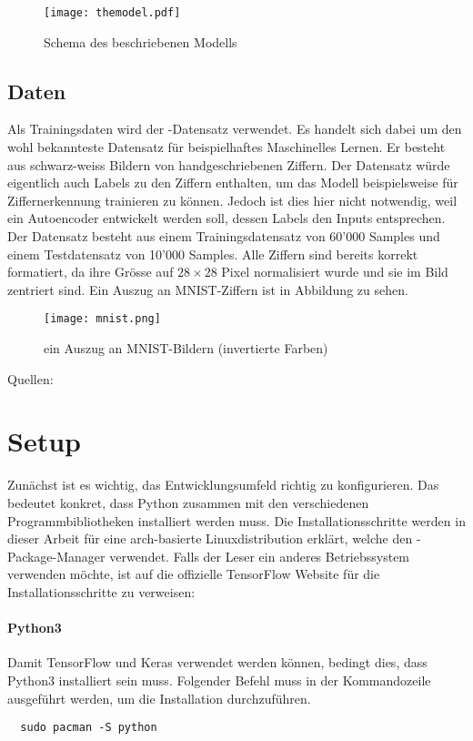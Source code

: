 \begin{figure}[h!]
  \centering
  \texttt{[image: themodel.pdf]}
  \caption{Schema des beschriebenen Modells}
\end{figure}

\subsection{Daten}
Als Trainingsdaten wird der -Datensatz verwendet. Es handelt sich
dabei um den wohl bekannteste Datensatz für beispielhaftes Maschinelles Lernen.
Er besteht aus schwarz-weiss Bildern von handgeschriebenen Ziffern.
Der Datensatz würde eigentlich auch Labels zu den Ziffern enthalten, um das Modell beispielsweise
für Ziffernerkennung trainieren zu können. Jedoch ist dies hier nicht notwendig,
weil ein Autoencoder entwickelt werden soll, dessen Labels den Inputs entsprechen.
\para{}
Der Datensatz besteht aus einem Trainingsdatensatz von 60'000 Samples und einem Testdatensatz
von 10'000 Samples. Alle Ziffern sind bereits korrekt formatiert, da ihre Grösse
auf $28 \times 28$ Pixel normalisiert wurde und sie im Bild zentriert sind. Ein
Auszug an MNIST-Ziffern ist in Abbildung  zu sehen.
\para{}
\begin{figure}[h!]
  \centering
  \texttt{[image: mnist.png]}
  \caption{ein Auszug an MNIST-Bildern (invertierte Farben) \cite{res:mnist_images}}
  \label{fig:minst}
\end{figure}
\para{}
Quellen: \cite{net:mnist}

\section{Setup}
Zunächst ist es wichtig, das Entwicklungsumfeld richtig zu konfigurieren. Das
bedeutet konkret, dass Python zusammen mit den verschiedenen Programmbibliotheken
installiert werden muss.
\para{}
Die Installationsschritte werden in dieser Arbeit für eine arch-basierte
Linuxdistribution erklärt, welche den -Package-Manager verwendet.
\para{}
Falls der Leser ein anderes Betriebssystem verwenden möchte, ist auf die offizielle
TensorFlow Website für die Installationsschritte zu verweisen:
\para{}

\paragraph{Python3}
Damit TensorFlow und Keras verwendet werden können, bedingt dies, dass Python3
installiert sein muss.
Folgender Befehl muss in der Kommandozeile ausgeführt werden, um die
Installation durchzuführen.
\begin{verbatim}
  sudo pacman -S python
\end{verbatim}

